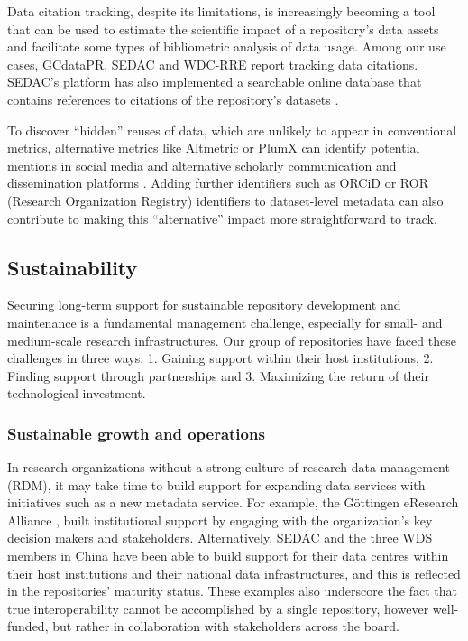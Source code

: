 \documentclass{interact}
\begin{document}
Data citation tracking, despite its limitations, is increasingly becoming a tool that can be used to estimate the scientific impact of a repository's data assets and facilitate some types of bibliometric analysis of data usage. Among our use cases, GCdataPR, SEDAC and WDC-RRE report tracking data citations. SEDAC’s platform has also implemented a searchable online database that contains references to citations of the repository’s datasets \parencite{sedac_citations_nodate}. 

To discover “hidden” reuses of data, which are unlikely to appear in conventional metrics, alternative metrics like Altmetric \parencite{altmetric_altmetric_2015} or PlumX \parencite{plumx_about_2021} can identify potential mentions in social media and alternative scholarly communication and dissemination platforms \parencite{peters_research_2016}. Adding further identifiers such as ORCiD or ROR (Research Organization Registry) identifiers to dataset-level metadata can also contribute to making this “alternative” impact more straightforward to track.

\subsection{Sustainability}
Securing long-term support for sustainable repository development and maintenance is a fundamental management challenge, especially for small- and medium-scale research infrastructures. Our group of repositories have faced these challenges in three ways: 1. Gaining support within their host institutions, 2. Finding support through partnerships and 3. Maximizing the return of their technological investment. 

\subsubsection{Sustainable growth and operations}

In research organizations without a strong culture of research data management (RDM), it may take time to build support for expanding data services with initiatives such as a new metadata service. For example, the Göttingen eResearch Alliance \parencite{dierkes_gottingen_2016}, built institutional support by engaging with the organization's key decision makers and stakeholders. Alternatively, SEDAC and the three WDS members in China have been able to build support for their data centres within their host institutions and their national data infrastructures, and this is reflected in the repositories’ maturity status. These examples also underscore the fact that true interoperability cannot be accomplished by a single repository, however well-funded, but rather in collaboration with stakeholders across the board.
\end{document}
